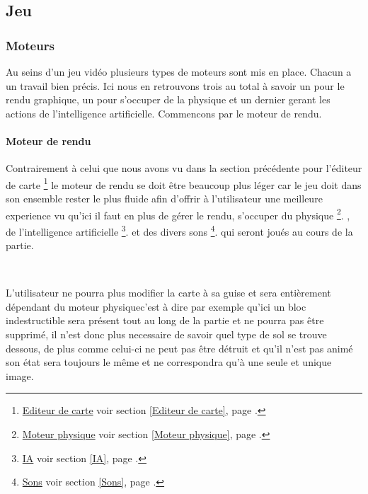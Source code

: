 \subsection{Jeu}

	\subsubsection{Moteurs}
	
		Au seins d'un jeu vidéo plusieurs types de moteurs sont mis en place.
		Chacun a un travail bien précis.
		Ici nous en retrouvons trois au total à savoir un pour le rendu graphique, un
		pour s'occuper de la physique et un dernier gerant les actions de
		l'intelligence artificielle.
		Commencons par le moteur de rendu.
	
		\paragraph{Moteur de rendu\\}
		
			Contrairement à celui que nous avons vu dans la section précédente pour
			l'éditeur de carte
			\footnote{
				\hyperlink{Editeur de carte}{Editeur de carte}
				\og voir section \ref{Editeur de carte}, page \pageref{Editeur de carte}.\fg
			}
			le moteur de rendu se doit être beaucoup plus léger car le jeu doit dans son
			ensemble rester le plus fluide afin d'offrir à l'utilisateur une meilleure
			experience vu qu'ici il faut en plus de gérer le rendu, s'occuper du
			physique
			\footnote{
				\hyperlink{Moteur physique}{Moteur physique}
				\og voir section \ref{Moteur physique}, page \pageref{Moteur physique}.\fg
			}.
			, de l'intelligence artificielle
			\footnote{
				\hyperlink{IA}{IA}
				\og voir section \ref{IA}, page \pageref{IA}.\fg
			}.
			et des divers sons
			\footnote{
				\hyperlink{Sons}{Sons}
				\og voir section \ref{Sons}, page \pageref{Sons}.\fg
			}.
			qui seront joués au cours de la partie.		
			
			$\,$	
			
			L'utilisateur ne pourra plus modifier la carte à sa guise et sera
			entièrement dépendant du moteur physique\footnotemark[3] c'est à dire par
			exemple qu'ici un bloc indestructible sera présent tout au long de la
			partie et ne pourra pas être supprimé, il n'est donc plus necessaire de
			savoir quel type de sol se trouve dessous, de plus comme celui-ci ne peut pas
			être détruit et qu'il n'est pas animé son état sera toujours le même et ne
			correspondra qu'à une seule et unique image.
			
